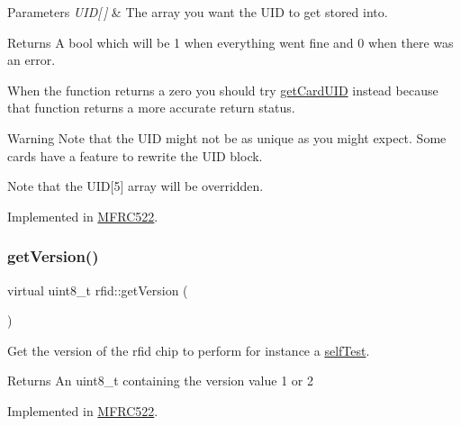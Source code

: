 \begin{DoxyParams}{Parameters}
{\em U\+I\+D\mbox{[}$\,$\mbox{]}} & The array you want the U\+ID to get stored into. \\
\hline
\end{DoxyParams}
\begin{DoxyReturn}{Returns}
A bool which will be 1 when everything went fine and 0 when there was an error.
\end{DoxyReturn}
When the function returns a zero you should try \mbox{\hyperlink{classrfid_afeb2a321694ceaf84db793f5efb3a750}{get\+Card\+U\+ID}} instead because that function returns a more accurate return status. \begin{DoxyWarning}{Warning}
Note that the U\+ID might not be as unique as you might expect. Some cards have a feature to rewrite the U\+ID block. 

Note that the U\+ID\mbox{[}5\mbox{]} array will be overridden. 
\end{DoxyWarning}


Implemented in \mbox{\hyperlink{class_m_f_r_c522_a33c20be6030f635d986984db4999a1eb}{M\+F\+R\+C522}}.

\mbox{\label{classrfid_a27619628e718bb781f912aead770079a}} 
\subsubsection{\texorpdfstring{get\+Version()}{getVersion()}}
{\footnotesize\ttfamily virtual uint8\+\_\+t rfid\+::get\+Version (\begin{DoxyParamCaption}{ }\end{DoxyParamCaption})\hspace{0.3cm}{\ttfamily [pure virtual]}}



Get the version of the rfid chip to perform for instance a \mbox{\hyperlink{classrfid_a93e5430380a14fd652e7ca1ce6443198}{self\+Test}}. 

\begin{DoxyReturn}{Returns}
An uint8\+\_\+t containing the version value 1 or 2 
\end{DoxyReturn}


Implemented in \mbox{\hyperlink{class_m_f_r_c522_a25fb0a50bf7db51ab9c5bc2ff4fa84e3}{M\+F\+R\+C522}}.

\mbox{\label{classrfid_a7f993197e5aa12e7b3bfb1576552bbf1}} 
